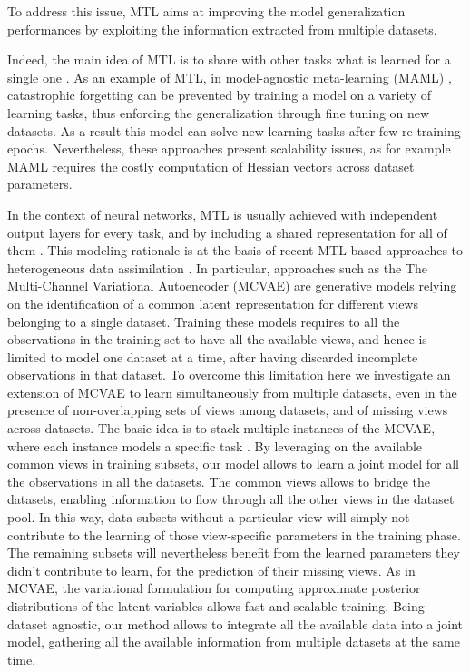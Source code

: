 To address this issue, MTL aims at improving the model generalization performances by exploiting the information extracted from multiple datasets.

Indeed, the main idea of MTL is to share with other tasks what is learned for a single one \citep{Caruana1998, Dorado-Moreno2020}.
As an example of MTL, in model-agnostic meta-learning (MAML) \citep{MAML1}, catastrophic forgetting can be prevented by training a model on a variety of learning tasks, thus enforcing the generalization through fine tuning on new datasets.
As a result this model can solve new learning tasks after few re-training epochs.
Nevertheless, these approaches present scalability issues, as for example MAML requires the costly computation of Hessian vectors across dataset parameters.

In the context of neural networks, MTL is usually achieved with independent output layers for every task, and by including a shared representation for all of them \citep{Dorado-Moreno2020}.
This modeling rationale is at the basis of recent MTL based approaches to heterogeneous data assimilation \citep{Wu2018, Antelmi2019, Shi2019}.
In particular, approaches such as the The Multi-Channel Variational Autoencoder (MCVAE) \citep{Antelmi2019} are generative models relying on the identification of a common latent representation for different views belonging to a single dataset.
Training these models requires to all the observations in the training set to have all the available views, and hence is limited to model one dataset at a time, after having discarded incomplete observations in that dataset.
%
To overcome this limitation here we investigate an extension of MCVAE to learn simultaneously from multiple datasets, even in the presence of non-overlapping sets of views among datasets, and of missing views across datasets.
The basic idea is to stack multiple instances of the MCVAE, where each instance models a specific task .
By leveraging on the available common views in training subsets, our model allows to learn a joint model for all the observations in all the datasets.
The common views allows to bridge the datasets, enabling information to flow through all the other views in the dataset pool.
In this way, data subsets without a particular view will simply not contribute to the learning of those view-specific parameters in the training phase.
The remaining subsets will nevertheless benefit from the learned parameters they didn't contribute to learn, for the prediction of their missing views.
As in MCVAE, the variational formulation for computing approximate posterior distributions of the latent variables allows fast and scalable training.
Being dataset agnostic, our method allows to integrate all the available data into a joint model, gathering  all the available information from multiple datasets at the same time.

